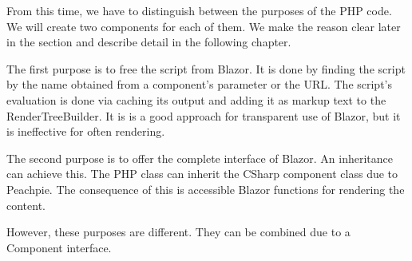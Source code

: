 From this time, we have to distinguish between the purposes of the PHP code.
We will create two components for each of them.
We make the reason clear later in the section and describe detail in the following chapter.

The first purpose is to free the script from Blazor.
It is done by finding the script by the name obtained from a component's parameter or the URL.
The script's evaluation is done via caching its output and adding it as markup text to the RenderTreeBuilder.
It is is a good approach for transparent use of Blazor, but it is ineffective for often rendering.


The second purpose is to offer the complete interface of Blazor.
An inheritance can achieve this.
The PHP class can inherit the CSharp component class due to Peachpie.
The consequence of this is accessible Blazor functions for rendering the content.

However, these purposes are different. They can be combined due to a Component interface.







